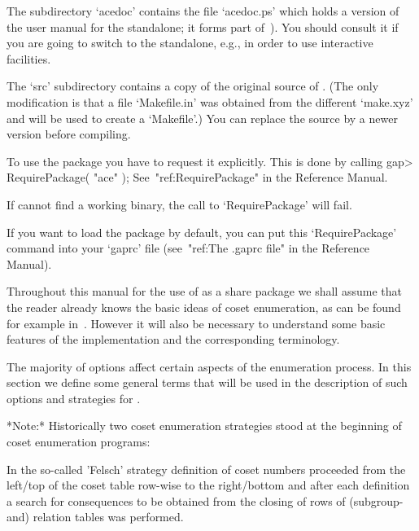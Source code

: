 The subdirectory `acedoc' contains the file `acedoc.ps' which holds a
version of the user manual for the {\ACE} standalone;
it forms part of~\cite{HR99a}).
You should consult it if you are going to switch to the {\ACE}
standalone, e.g., in order to use interactive facilities.

The  `src' subdirectory  contains a  copy  of the  original source  of
{\ACE}.  (The  only modification  is  that  a  file `Makefile.in'  was
obtained from  the different `make.xyz' and  will be used  to create a
`Makefile'.)  You  can replace  the source by  a newer  version before
compiling.



To use  the {\ACE} package you  have to request it  explicitly. This is
done by calling
\begintt
gap> RequirePackage( "ace" );
\endtt
See~"ref:RequirePackage" in the {\GAP} Reference Manual.

If {\GAP} cannot find a working binary, the call to `RequirePackage' will
fail.

If you want to load the {\ACE} package by default, you can put this
`RequirePackage' command into your `gaprc' file
(see~"ref:The .gaprc file" in the {\GAP} Reference Manual).


Throughout this manual for the use of {\ACE} as a {\GAP} share package
we shall assume that the reader already knows the basic ideas of coset
enumeration, as  can be found for example  in~\cite{Neu82}. However it
will  also be  necessary  to  understand some  basic  features of  the
implementation and the corresponding terminology.


The  majority of  options affect  certain aspects  of  the enumeration
process. In  this section  we define some  general terms that  will be
used in the description of such options and strategies for {\ACE}.

*Note:*  Historically two  coset enumeration  strategies stood  at the
beginning  of coset  enumeration programs:  

\beginitems{--}

\item
In  the  so-called  'Felsch'  strategy  definition  of  coset  numbers
proceeded  from  the  left/top  of the  coset  table  row-wise  to  the
right/bottom and after each definition a search for consequences to be
obtained from the  closing of rows of (subgroup-  and) relation tables
was performed.

